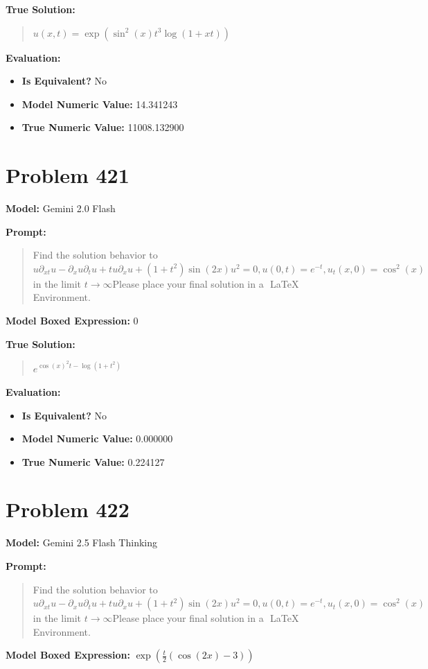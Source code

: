 \documentclass{article}
\begin{document}
\textbf{True Solution:}
\begin{quote}
$u(x,t) = \exp(\sin^2(x) t^3 \log(1 + xt))$
\end{quote}

\textbf{Evaluation:}
\begin{itemize}
\item \textbf{Is Equivalent?} No
\item \textbf{Model Numeric Value:} 14.341243
\item \textbf{True Numeric Value:} 11008.132900
\end{itemize}
\vspace{1cm}
\section*{Problem 421}
\textbf{Model:} Gemini 2.0 Flash

\textbf{Prompt:}
\begin{quote}
Find the solution behavior to$u \partial_{xt} u - \partial_x u \partial_t u + t u \partial_x u + (1 + t^2) \sin(2x) u^2 = 0, u(0, t) = e^{-t}, u_t(x, 0) = \cos^2(x)$ in the limit $t \to \infty$Please place your final solution in a $\boxed{}$ LaTeX Environment.
\end{quote}
\textbf{Model Boxed Expression:} $0$

\textbf{True Solution:}
\begin{quote}
$e^{\cos(x)^2 t - \log(1 + t^2)}$
\end{quote}

\textbf{Evaluation:}
\begin{itemize}
\item \textbf{Is Equivalent?} No
\item \textbf{Model Numeric Value:} 0.000000
\item \textbf{True Numeric Value:} 0.224127
\end{itemize}
\vspace{1cm}
\section*{Problem 422}
\textbf{Model:} Gemini 2.5 Flash Thinking

\textbf{Prompt:}
\begin{quote}
Find the solution behavior to$u \partial_{xt} u - \partial_x u \partial_t u + t u \partial_x u + (1 + t^2) \sin(2x) u^2 = 0, u(0, t) = e^{-t}, u_t(x, 0) = \cos^2(x)$ in the limit $t \to \infty$Please place your final solution in a $\boxed{}$ LaTeX Environment.
\end{quote}
\textbf{Model Boxed Expression:} $\exp\left(\frac{t}{2}(\cos(2x)-3)\right)$
\end{document}
